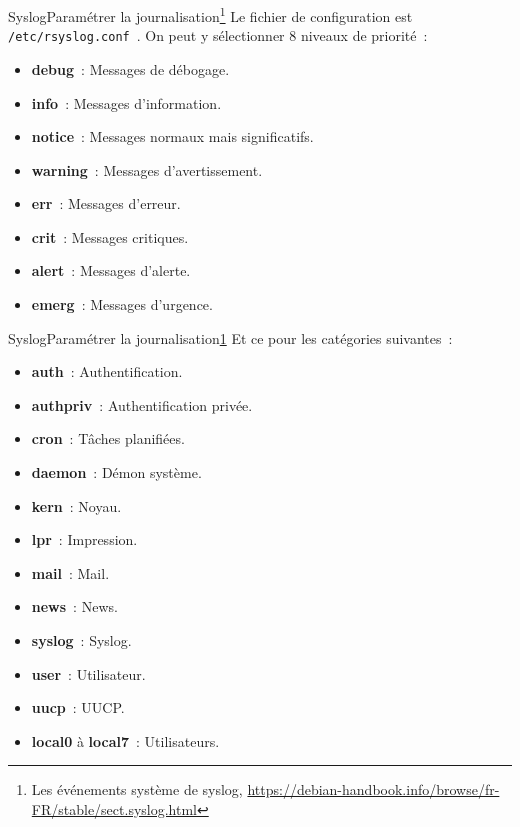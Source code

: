 \documentclass{beamer}
\begin{document}
    \begin{frame}{Syslog}{Paramétrer la journalisation\footnote{\label{syslog}Les événements système de syslog, \url{https://debian-handbook.info/browse/fr-FR/stable/sect.syslog.html}}}
        Le fichier de configuration est \lstinline{/etc/rsyslog.conf}~.
        \bigbreak
        On peut y sélectionner 8 niveaux de priorité~:
        \begin{itemize}
            \item \textbf{debug}~: Messages de débogage.
            \item \textbf{info}~: Messages d'information.
            \item \textbf{notice}~: Messages normaux mais significatifs.
            \item \textbf{warning}~: Messages d'avertissement.
            \item \textbf{err}~: Messages d'erreur.
            \item \textbf{crit}~: Messages critiques.
            \item \textbf{alert}~: Messages d'alerte.
            \item \textbf{emerg}~: Messages d'urgence.
        \end{itemize}
    \end{frame}

    \begin{frame}{Syslog}{Paramétrer la journalisation\cref{syslog}}
        Et ce pour les catégories suivantes~:
        \begin{itemize}
            \item \textbf{auth}~: Authentification.
            \item \textbf{authpriv}~: Authentification privée.
            \item \textbf{cron}~: Tâches planifiées.
            \item \textbf{daemon}~: Démon système.
            \item \textbf{kern}~: Noyau.
            \item \textbf{lpr}~: Impression.
            \item \textbf{mail}~: Mail.
            \item \textbf{news}~: News.
            \item \textbf{syslog}~: Syslog.
            \item \textbf{user}~: Utilisateur.
            \item \textbf{uucp}~: UUCP.
            \item \textbf{local0} à \textbf{local7}~: Utilisateurs.
        \end{itemize}
    \end{frame}
\end{document}
